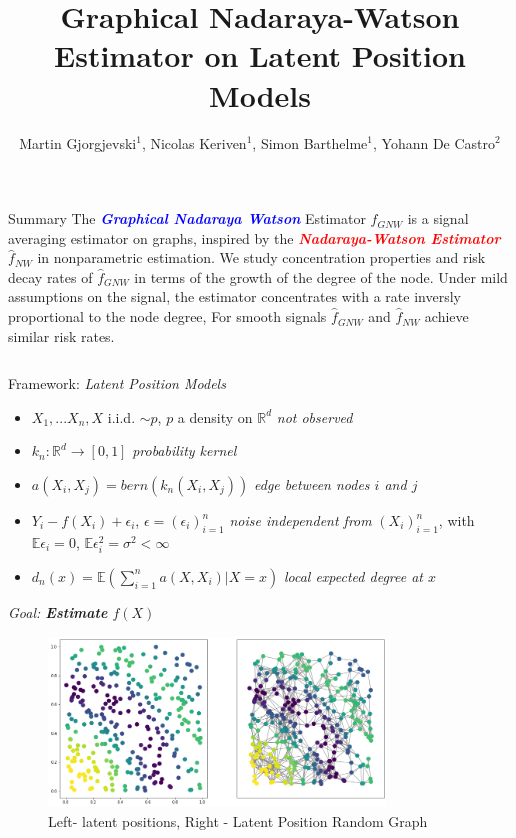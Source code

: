 \documentclass[final,dvipsnames]{beamer}
\title{Graphical Nadaraya-Watson Estimator on Latent Position Models}
\author{Martin Gjorgjevski$^1$, Nicolas Keriven$^1$, Simon Barthelme$^1$, Yohann De Castro$^2$}
\institute{$^1$CNRS Gipsa-Lab, Grenoble, $^2$CNRS Ecole Centrale Lyon, Lyon}
\newcommand{\myemphh}[1]{\textbf{\textcolor{blue}{#1}}}
\newcommand{\myemphr}[1]{\textbf{\textcolor{red}{#1}}}
\newcommand{\mycolbackgreen}[1]{
\hspace*{.01\linewidth}\begin{minipage}{.35\linewidth}
\begin{mdframed}[backgroundcolor=green!10,linewidth=1pt]
\vspace{10pt}
#1
\vspace{10pt}
\end{mdframed}
\end{minipage}
}
\begin{document}
\begin{frame}

\begin{block}{Summary}
    The \textit{\myemphh{Graphical Nadaraya Watson}} Estimator $\hat{f}_{GNW}$ is a signal averaging estimator on graphs, inspired by the \textit{\myemphr{Nadaraya-Watson Estimator}} $\hat{f}_{NW}$ in nonparametric estimation. 
    We study concentration properties and risk decay rates of $\hat{f}_{GNW}$ in terms of the growth of the degree of the node. Under mild assumptions on the signal, the estimator concentrates with a rate inversly proportional to the node degree, For smooth signals $\hat{f}_{GNW}$ and $\hat{f}_{NW}$ achieve similar risk rates.    
\end{block}    

\begin{columns}[T]

    

\begin{column}{0.49\textwidth}
\begin{block}{Framework: \textit{Latent Position Models}}
\begin{itemize}
\item $X_1,...X_n,X$ i.i.d. $\sim p$, $p$ a density on $\mathbb{R}^d$
\textit{not observed}
\vspace{10pt}
\item $k_n:\mathbb{R}^d\to [0,1]$ \textit{probability kernel} 
\vspace{10pt}
\item $a(X_i,X_j)=bern(k_n(X_i,X_j))$ \textit{edge between nodes $i$ and $j$}
\vspace{10pt}
\item $Y_i-f(X_i)+\epsilon_i$, $\epsilon=(\epsilon_i)_{i=1}^n$ \textit{noise independent from} $(X_i)_{i=1}^n$, with $\mathbb{E}\epsilon_i=0$, $\mathbb{E}\epsilon_i^2
=\sigma^2<\infty$ 
\vspace{10pt}
\item $d_n(x)=\mathbb{E}(\sum_{i=1}^n a(X,X_i)|X=x)$ \textit{local expected degree at $x$}
\end{itemize}
\vspace{20pt}
\mycolbackgreen{
    \textit{Goal: \textbf{Estimate} $f(X)$}
}
\begin{figure}
    \centering
    \includegraphics[width=0.8\textwidth]{lpm_image_correct.png}
    \caption{Left- latent positions, Right - Latent Position Random Graph}
    \label{fig:my_label}
    \end{figure}



\end{block}
\end{column}
\end{columns}
\end{frame}
\end{document}
